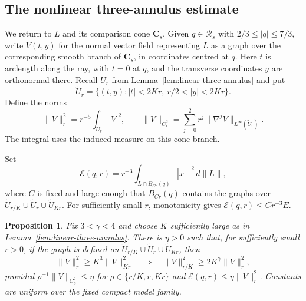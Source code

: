 \documentclass[11pt,a4paper]{article}
\numberwithin{equation}{section}
\newtheorem{proposition}[theorem]{Proposition}
\theoremstyle{definition}
\theoremstyle{remark}
\begin{document}
	\subsection{The nonlinear three-annulus estimate}
	
	We return to $L$ and its comparison cone $\mathbf C_s$.
	Given $q\in\mathcal R_s$ with $2/3\le |q|\le7/3$,
	write $V(t,y)$ for the normal vector field representing $L$ as a graph
	over the corresponding smooth branch of $\mathbf C_s$, in coordinates
	centred at $q$.
	Here $t$ is arclength along the ray, with $t=0$ at $q$, and the
	transverse coordinates $y$ are orthonormal there. Recall $U_r$ from
	Lemma~\ref{lem:linear-three-annulus} and put
	\[
	\widetilde U_r=\{(t,y):|t|<2Kr,\ r/2<|y|<2Kr\}.
	\]
	Define the norms
	\[
	\|V\|_r^2=r^{-5}\int_{U_r}|V|^2,\qquad
	\|V\|_{C^2_r}=\sum_{j=0}^2r^j\|\nabla^jV\|_{L^\infty(\widetilde U_r)}.
	\]
	The integral uses the induced measure on this cone branch.
	
	Set
	\[
	\mathcal E(q,r)=r^{-3}\int_{L\cap B_{Cr}(q)}|x^\perp|^2\,d\|L\|,
	\]
	where $C$ is fixed and large enough that $B_{Cr}(q)$ contains the graphs over
	$\widetilde U_{r/K}\cup\widetilde U_r\cup\widetilde U_{Kr}$.
	For sufficiently small $r$, monotonicity gives $\mathcal E(q,r)\le Cr^{-3}E$.
	\begin{proposition}\label{prop:perturbative-transfer}
		Fix $3<\gamma<4$ and choose $K$ sufficiently large as in
		Lemma~\ref{lem:linear-three-annulus}.
		There is $\eta>0$ such that, for sufficiently small $r>0$, if the graph is
		defined on $\widetilde U_{r/K}\cup\widetilde U_r\cup\widetilde U_{Kr}$, then
		\[
		\|V\|_r^2\ge K^3\|V\|_{K r}^2
		\quad\Longrightarrow\quad
		\|V\|_{r/K}^2\ge 2K^{\gamma}\|V\|_r^2,
		\]
		provided $\rho^{-1}\|V\|_{C^2_\rho}\le\eta$ for
		$\rho\in\{r/K,r,Kr\}$ and
		$\mathcal E(q,r)\le\eta\|V\|_r^2$.
		Constants are uniform over the fixed compact model family.
	\end{proposition}
	
\end{document}
